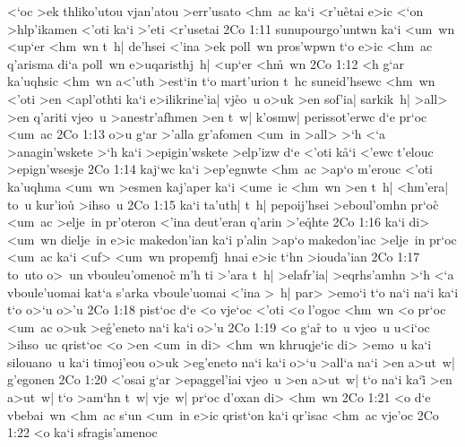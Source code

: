 <`oc
>ek
thliko'utou
vjan'atou
>err'usato
<hm~ac
ka`i
<r'u\r{e}tai
e>ic
<`on
>hlp'ikamen
<'oti
ka`i
>'eti
<r'usetai\bibvsend
\vs 2Co 1:11
sunupourgo'untwn
ka`i
<um~wn
<up`er
<hm~wn
t~h|
de'hsei
<'ina
>ek
poll~wn
pros'wpwn
t`o
e>ic
<hm~ac
q'arisma
di`a
poll~wn
e>uqaristhj~h|
<up`er
<h\r{m}~wn\bibvsend
{}
\vs 2Co 1:12
<h
g`ar
ka'uqhsic
<hm~wn
a<'uth
>est`in
t`o
mart'urion
t~hc
suneid'hsewc
<hm~wn
<'oti
>en
<apl'othti
ka`i
e>ilikrine'ia|
vj\r{e}o~u
o>uk
>en
sof'ia|
sarkik~h|
>all>
>en
q'ariti
vjeo~u
>anestr'afhmen
>en
t~w|
k'osmw|
perissot'erwc
d`e
pr`oc
<um~ac\bibvsend
\vs 2Co 1:13
o>u
g`ar
>'alla
gr'afomen
<um~in
>all>
>`h
<`a
>anagin'wskete
>`h
ka`i
>epigin'wskete
>elp'izw
d`e
<'oti
k\r{a}`i
<'ewc
t'elouc
>epign'wsesje\bibvsend
\vs 2Co 1:14
kaj`wc
ka`i
>ep'egnwte
<hm~ac
>ap`o
m'erouc
<'oti
ka'uqhma
<um~wn
>esmen
kaj'aper
ka`i
<ume~ic
<hm~wn
>en
t~h|
<hm'era|
to~u
kur'io\r{u}
>ihso~u\bibvsend
\vs 2Co 1:15
ka`i
ta'uth|
t~h|
pepoij'hsei
>eboul'omhn
pr`oc\r{}
<um~ac
>elje~in
pr'oteron
<'ina
deut'eran
q'arin
>'e\r{q}hte\bibvsend
{}
\vs 2Co 1:16
ka`i
di>
<um~wn
dielje~in
e>ic
makedon'ian
ka`i
p'alin
>ap`o
makedon'iac
>elje~in
pr`oc
<um~ac
ka`i
<uf>
<um~wn
propemfj~hnai
e>ic
t`hn
>iouda'ian\bibvsend
\vs 2Co 1:17
to~uto
o>~un
vbouleu'omenoc\r{}
m'h
ti
>'ara
t~h|
>elafr'ia|
>eqrhs'amhn
>`h
<`a
vboule'uomai
kat`a
s'arka
vboule'uomai
<'ina
>~h|
par>
>emo`i
t`o
na`i
na`i
ka`i
t`o
o>`u
o>'u\bibvsend
\vs 2Co 1:18
pist`oc
d`e
<o
vje`oc
<'oti
<o
l'ogoc
<hm~wn
<o
pr`oc
<um~ac
o>uk
>e\r{g}'eneto
na`i
ka`i
o>'u\bibvsend
\vs 2Co 1:19
<o
g`ar\r{}
to~u
vjeo~u
u<i`oc
>ihso~uc
qrist`oc
<o
>en
<um~in
di>
<hm~wn
khruqje`ic
di>
>emo~u
ka`i
silouano~u
ka`i
timoj'eou
o>uk
>eg'eneto
na`i
ka`i
o>`u
>all`a
na`i
>en
a>ut~w|
g'egonen\bibvsend
\vs 2Co 1:20
<'osai
g`ar
>epaggel'iai
vjeo~u
>en
a>ut~w|
t`o
na`i
ka`i\r{}
>en
a>ut~w|
t`o
>am`hn
t~w|
vje~w|
pr`oc
d'oxan
di>
<hm~wn\bibvsend
\vs 2Co 1:21
<o
d`e
vbebai~wn
<hm~ac
s`un
<um~in
e>ic
qrist`on
ka`i
qr'isac
<hm~ac
vje'oc\bibvsend
\vs 2Co 1:22
<o
ka`i
sfragis'amenoc
